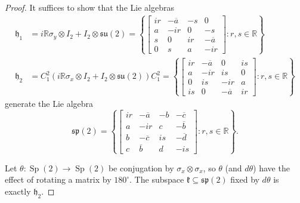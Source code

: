 \documentclass[10pt,a4paper]{amsart}
\newcommand{\RR}{\mathbb{R}}
\newcommand{\Sp}{\operatorname{Sp}}
\newcommand{\h}{\mathfrak{h}}
\renewcommand{\k}{\mathfrak{k}}
\renewcommand{\sp}{\mathfrak{sp}}
\newcommand{\su}{\mathfrak{su}}
\begin{document}
\begin{proof}
It suffices to show that the Lie algebras
\begin{align*}
\h_1 &= i \RR\sigma_y \otimes I_2 + I_2 \otimes \su(2) = \left\{ \left[ \begin{smallmatrix}
ir & -\overline{a} & -s & 0\\
a &  -ir & 0 & -s\\
s & 0 & ir & -\overline{a}\\
0 & s & a & -ir \end{smallmatrix} \right] : r,s \in \RR\right\} \\
\h_2 &= C_1^2 (i \RR \sigma_x \otimes I_2 + I_2 \otimes \su(2)) C_1^2 = \left\{ \left[ \begin{smallmatrix}
ir & -\overline{a} & 0 & is\\
a &  -ir & is & 0\\
0 & is & -ir & a\\
is & 0 & -\overline{a} & ir
\end{smallmatrix} \right] : r,s \in \RR\right\}
\end{align*}
generate the Lie algebra
\begin{equation*}
\sp(2) = \left\{ \left[ \begin{smallmatrix}
ir & -\overline{a} & -b & -\overline{c}\\
a &  -ir 		  & c   & -\overline{b}\\
b & -\overline{c}  & is & -\overline{d}\\
c & \overline{b}   & d  & -is
\end{smallmatrix}\right] : r,s \in \RR \right\}.
\end{equation*}

Let $\theta : \Sp(2) \to \Sp(2)$ be conjugation by $\sigma_x \otimes \sigma_x$, so $\theta$ (and $d\theta$) have the effect of rotating a matrix by $180^\circ$. The subspace $\k \subseteq \sp(2)$ fixed by $d\theta$ is exactly $\h_2$. 


\end{proof}
\end{document}
